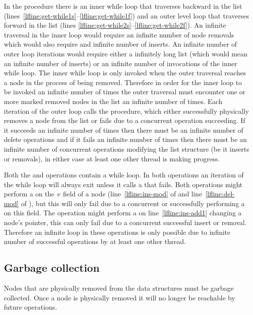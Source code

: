 In the  procedure there is an inner while loop that traverses backward in the list (lines~\ref{lfline:get-while1s}--\ref{lfline:get-while1f})
and an outer level loop that traverses forward in the list (lines \ref{lfline:get-while2s}--\ref{lfline:get-while2f}).
An infinite traversal in the inner loop would require an infinite number of node removals which would also require and infinite
number of inserts.
An infinite number of outer loop iterations would require either a infinitely long list (which would mean an infinite number of inserts)
or an infinite number of invocations of the inner while loop.
The inner while loop is only invoked when the outer traversal reaches a node in the process of being removed.
Therefore in order for the inner loop to be invoked an infinite number of times
the outer traversal must encounter one or more marked removed nodes in the list an infinite number of times.
Each iteration of the outer loop calls the  procedure, which
either successfully physically removes a node from the list or fails due to a concurrent operation succeeding.
If it succeeds an infinite number of times then there must be an infinite number of delete operations and if it fails an infinite number of times then
there must be an infinite number of concurrent operations modifying the list structure (be it inserts or removals), in either case at least one other thread is making progress.

Both the  and  operations contain a while loop.
In both operations an iteration of the while loop will always exit unless it calls a \CAS{} that fails.
Both operations might perform a \CAS{} on the $\ms{v}$ field of a node (line~\ref{lfline:ins-mod} of  and line~\ref{lfline:del-mod}  of ),
but this \CAS{} will only fail due to a concurrent  or  successfully performing a \CAS{} on this field.
The  operation might perform a \CAS{} on line~\ref{lfline:ins-add1} changing a node's pointer, this \CAS{} can only fail
due to a concurrent successful insert or removal.
Therefore an infinite loop in these operations is only possible due to infinite number of successful operations by at least one other thread.

\subsection{Garbage collection}\label{ssec:gc}

Nodes that are physically removed from the data structures must be garbage collected.
Once a node is physically removed it will no longer be reachable by future operations.

